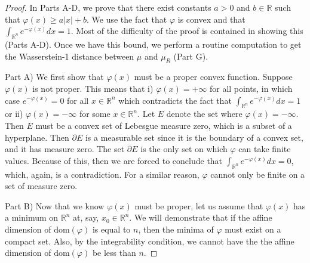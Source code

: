 \documentclass{amsart}
\theoremstyle{lemma}
\theoremstyle{remark}
\begin{document}
\begin{proof}
In Parts A-D, we prove that there exist constants $a>0$ and $b \in \mathbb{R}$ such that $\varphi(x) \geq a \vert x \vert + b$. We use the fact that $\varphi$ is convex and that $\int_{\mathbb{R}^n} e^{-\varphi(x)}dx = 1$. Most of the difficulty of the proof is contained in showing this (Parts A-D). Once we have this bound, we perform a routine computation to get the Wasserstein-1 distance between $\mu$ and $\mu_{R}$ (Part G).

Part A) We first show that $\varphi(x)$ must be a proper convex function. Suppose $\varphi(x)$ is not proper. This means that i) $\varphi(x) = +\infty$ for all points, in which case $e^{-\varphi(x)} = 0$ for all $x\in \mathbb{R}^n$ which contradicts the fact that $\int_{\mathbb{R}^n} e^{-\varphi(x)}dx = 1$ or ii) $\varphi(x) = -\infty$ for some $x \in \mathbb{R}^n$. Let $E$ denote the set where $\varphi(x) = -\infty$. Then $E$ must be a convex set of Lebesgue measure zero, which is a subset of a hyperplane. Then $\partial E$ is a measurable set since it is the boundary of a convex set, and it has measure zero. The set $\partial E$ is the only set on which $\varphi$ can take finite values. Because of this, then we are forced to conclude that $\int_{\mathbb{R}^n} e^{-\varphi(x)}dx = 0$, which, again, is a contradiction. For a similar reason, $\varphi$ cannot only be finite on a set of measure zero.

Part B) Now that we know $\varphi(x)$ must be proper, let us assume that $\varphi(x)$ has a minimum on $\mathbb{R}^n$ at, say, $x_0 \in \mathbb{R}^n$. We will demonstrate that if the affine dimension of $\text{dom}(\varphi)$ is equal to $n$, then the minima of $\varphi$ must exist on a compact set. Also, by the integrability condition, we cannot have the the affine dimension of $\text{dom}(\varphi)$ be less than $n$.


\end{proof}
\end{document}
